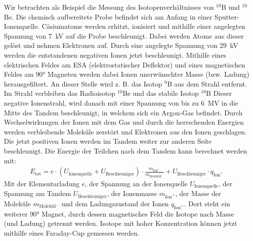 Wir betrachten als Beispiel die Messung des Isotopenverhältnisses von $^{10}$B und $^{10}$Be.
Die chemisch aufbereitete Probe befindet sich am Anfang in einer Sputter-Ionenquelle.
Cäsiumatome werden erhitzt, ionisiert und mithilfe einer angelegten Spannung von \SI{7}{\kilo\volt} auf die Probe beschleunigt.
Dabei werden Atome aus dieser gelöst und nehmen Elektronen auf.
Durch eine angelegte Spannung von \SI{29}{\kilo\volt} werden die entstandenen negativen Ionen jetzt beschleunigt.
Mithilfe eines elektrischen Feldes am ESA (elektrostatischer Deflektor) und eines magnetischen Feldes am \ang{90} Magneten werden dabei Ionen unerwünschter Masse (bzw. Ladung) herausgefiltert.
An dieser Stelle wird z. B. das Isotop  $^{9}$B aus dem Strahl entfernt.
Im Strahl verbleiben das Radioisotop $^{10}$Be und das stabile Isotop $^{10}$B
Dieser negative Ionenstrahl, wird danach mit einer Spannung von bis zu \SI{6}{\mega\volt} in die Mitte des Tandem beschleunigt, in welchem sich ein Argon-Gas befindet.
Durch Wechselwirkungen der Ionen mit dem Gas und durch die herrschenden Energien werden verbleibende Moleküle zerstört und Elektronen aus den Ionen geschlagen.
Die jetzt positiven Ionen werden im Tandem weiter zur anderen Seite beschleunigt.
Die Energie der Teilchen nach dem Tandem kann berechnet werden mit:
\begin{gather}
    E_{\text{tot}} = e \cdot (U_{\text{Ionenquelle}} + U_{\text{Beschleuniger}}) \cdot \frac{m_{\text{Ion}^{+}}}{m_{\text{Molekül}^{-}}} + U_{\text{Beschleuniger}} \cdot q_{\text{Ion}^{+}}
\end{gather}
Mit der Elementarladung $e$, der Spannung an der Ionenquelle $U_{\text{Ionenquelle}}$, der Spannung am Tandem $U_{\text{Beschleuniger}}$, der Ionenmasse $m_{\text{Ion}^{+}}$, der Masse der Moleküle $m_{\text{Molekül}^{-}}$ und dem Ladungszustand der Ionen $q_{\text{Ion}^{+}}$.
Dort steht ein weiterer \ang{90} Magnet, durch dessen magnetisches Feld die Isotope nach Masse (und Ladung) getrennt werden.
Isotope mit hoher Konzentration können jetzt mithilfe eines Faraday-Cup gemessen werden.

